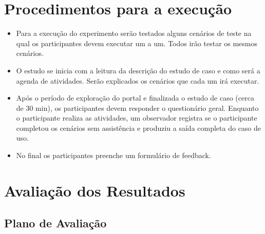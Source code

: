 \begin{table}[h]
\begin{tabular}{|p{5cm} |p{2.5cm}|l|l|}
\end{tabular}
\end{table}

\section{Procedimentos para a execução}

\begin{itemize}

\item Para a execução do experimento serão testados alguns cenários de teste na qual os participantes devem executar um a um. Todos irão testar os mesmos cenários.
\item O estudo se inicia com a leitura da descrição do estudo de caso e como será a agenda de atividades. Serão explicados os cenários que cada um irá executar.
\item Após o período de exploração do portal e finalizada o estudo de caso (cerca de 30 min), os participantes devem responder o questionário geral.
Enquanto o participante realiza as atividades, um observador registra se o participante completou os cenários sem assistência e produziu a saída completa do caso de uso.
\item No final os participantes preenche um formulário de feedback.

\end{itemize}

\section{Avaliação dos Resultados}

\subsection{Plano de Avaliação}

